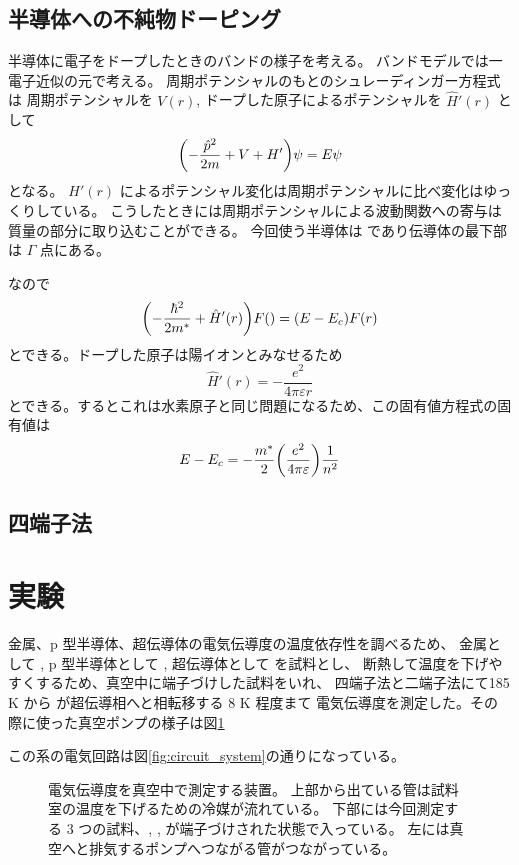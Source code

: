 \documentclass[11pt,dvipdfmx,a4paper]{jsarticle}
\begin{document}
\subsection{半導体への不純物ドーピング}
半導体に電子をドープしたときのバンドの様子を考える。
バンドモデルでは一電子近似の元で考える。
周期ポテンシャルのもとのシュレーディンガー方程式は
周期ポテンシャルを \(V(r)\), ドープした原子によるポテンシャルを \(\hat{H}'(r)\) として
\begin{equation}
	\qty(-\frac{\hat{p}^2}{2m}+V+H')\psi = E \psi
\end{equation}
となる。
\(H'(r)\) によるポテンシャル変化は周期ポテンシャルに比べ変化はゆっくりしている。
こうしたときには周期ポテンシャルによる波動関数への寄与は質量の部分に取り込むことができる。
今回使う半導体は  であり伝導体の最下部は \(\Gamma\) 点にある。

なので
\begin{equation}
	\qty(-\frac{\hbar^2}{2m^*}+\hat{H}'(r))F() = (E-E_c)F(r)
\end{equation}
とできる。ドープした原子は陽イオンとみなせるため
\begin{equation}
	\hat{H}'(r) = -\frac{e^2}{4\pi\varepsilon r}
\end{equation}
とできる。するとこれは水素原子と同じ問題になるため、この固有値方程式の固有値は
\begin{equation}
	E-E_c = -\frac{m^*}{2}\qty(\frac{e^2}{4\pi\varepsilon})\frac{1}{n^2}
\end{equation}


\subsection{四端子法}

\section{実験}
金属、p 型半導体、超伝導体の電気伝導度の温度依存性を調べるため、
金属として , p 型半導体として , 超伝導体として  を試料とし、
断熱して温度を下げやすくするため、真空中に端子づけした試料をいれ、
四端子法と二端子法にて185 K から  が超伝導相へと相転移する 8 K 程度まて
電気伝導度を測定した。その際に使った真空ポンプの様子は図\ref{pic:measure_system}

この系の電気回路は図\ref{fig:circuit_system}の通りになっている。

\begin{figure}[h]
	\centering
	\caption{
		電気伝導度を真空中で測定する装置。
		上部から出ている管は試料室の温度を下げるための冷媒が流れている。
		下部には今回測定する 3 つの試料、, ,  が端子づけされた状態で入っている。
		左には真空へと排気するポンプへつながる管がつながっている。
	}
	\label{pic:measure_system}
\end{figure}
\end{document}
